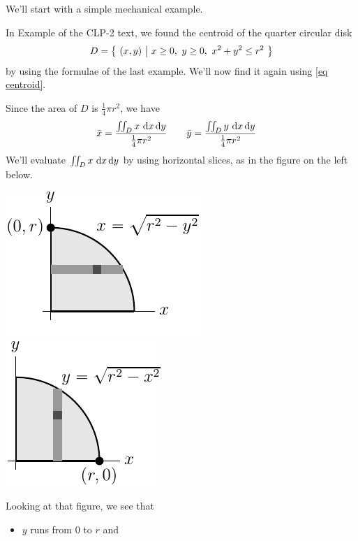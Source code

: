 We'll start with a simple mechanical example.

\begin{eg}\label{eg dblInt Iqc}
In Example  of the CLP-2 text, 
we found the centroid of the quarter circular disk 
\begin{equation*}
D=\big\{ \ (x,y)\ \big|\ x\ge 0,\ y\ge 0,\ x^2+y^2\le r^2\ \big\} 
\end{equation*}
by using the formulae of the last example. We'll now find it again using 
\eqref{eq centroid}.

Since the area of $D$ is $\frac{1}{4}\pi r^2$, we have
\begin{align*}
\bar x =\frac{\iint_D x\ \mathrm{d}x\,\mathrm{d}y}
                      {\frac{1}{4}\pi r^2}
\qquad
\bar y &=\frac{\iint_D y\ \mathrm{d}x\,\mathrm{d}y}
                     {\frac{1}{4}\pi r^2}
\end{align*}
We'll evaluate $\iint_D x\ \mathrm{d}x\,\mathrm{d}y$ by using horizontal 
slices, as in the figure on the left below. 
\begin{efig}
\begin{center}
    \includegraphics{centroidQuarterCircleh}\qquad
    \includegraphics{centroidQuarterCirclev}
\end{center}
\end{efig}
Looking at that figure, we see that
\begin{itemize}
\item 
$y$ runs from $0$ to $r$ and

\end{itemize}
\end{eg}
